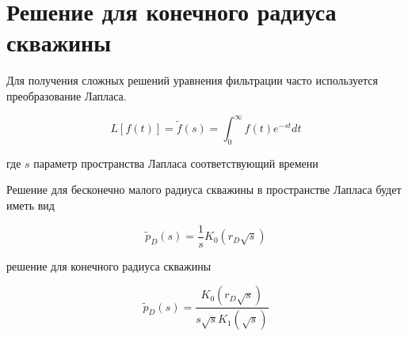 \section{Решение для конечного радиуса скважины}
Для получения сложных решений уравнения фильтрации часто используется преобразование Лапласа.

$$ L \left [ f(t) \right] = \tilde{f}(s) = \int_{0}^{\infty}f(t)e^{-st}dt $$

где $s$ параметр пространства Лапласа соответствующий времени

Решение для бесконечно малого радиуса скважины в пространстве Лапласа будет иметь вид

\begin{equation}  \label{eq:laplace_solution_1}
	\tilde{p}_D(s) = \frac{1}{s} K_0 \left( r_D \sqrt s  \right) 
\end{equation}

решение для конечного радиуса скважины \cite{Everdingen_1949}

\begin{equation} \label{eq:laplace_solution_2}
	\tilde{p}_D(s) = \frac{K_0 \left( r_D \sqrt{s}  \right) }{ s \sqrt{s} K_1 \left( \sqrt s  \right)  }
\end{equation}

